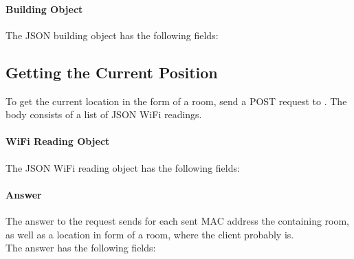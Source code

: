 \paragraph{Building Object}
The JSON building object has the following fields:
\begin{description}
\end{description}

\subsection{Getting the Current Position}
To get the current location in the form of a room, send a POST request to . The body consists of a list of JSON WiFi readings.

\paragraph{WiFi Reading Object}
The JSON WiFi reading object has the following fields:
\begin{description}
\end{description}

\paragraph{Answer}
The answer to the request sends for each sent MAC address the containing room, as well as a location in form of a room, where the client probably is.\\
The answer has the following fields:
\begin{description}
\end{description}
